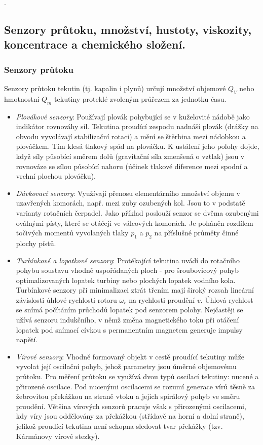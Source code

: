 \newpage . \newpage
\subsection{Senzory průtoku, množství, hustoty, viskozity, koncentrace a chemického složení.}
\subsubsection*{Senzory průtoku}
Senzory průtoku tekutin (tj. kapalin i plynů) určují množství objemové $ Q_V $ nebo hmotnostní $ Q_m $ tekutiny proteklé zvoleným průřezem za jednotku času.
\begin{itemize}
\item \textit{Plovákové senzory}: Používají plovák pohybující se v kuželovité nádobě jako indikátor rovnováhy sil. Tekutina proudící zespodu nadnáší plovák (drážky na obvodu vyvolávají stabilizační rotaci) a mění se štěrbina mezi nádobkou a plováčkem. Tím klesá tlakový spád na plováčku. K ustálení jeho polohy dojde, když síly působící směrem dolů (gravitační síla zmenšená o vztlak) jsou v rovnováze se sílou působící nahoru (účinek tlakové diference mezi spodní a vrchní plochou plováčku).
\item \textit{Dávkovací senzory}: Využívají přenosu elementárního množství objemu v uzavřených komorách, např. mezi zuby ozubených kol. Jsou to v podstatě varianty rotačních čerpadel. Jako příklad poslouží senzor se dvěma ozubenými oválnými písty, které se otáčejí ve válcových komorách. Je poháněn rozdílem točivých momentů vyvolaných tlaky $ p_1 $ a $ p_2 $ na příslušné průměty činné plochy pístů.
\item \textit{Turbínkové a lopatkové senzory}: Protékající tekutina uvádí do rotačního pohybu soustavu vhodně uspořádaných ploch - pro šroubovicový pohyb optimalizovaných lopatek turbiny nebo plochých lopatek vodního kola. Turbínkové senzory při minimalizaci ztrát třením mají široký rozsah lineární závislosti úhlové rychlosti rotoru $ \omega_r $ na rychlosti proudění $ v $. Úhlová rychlost se snímá počítáním průchodů lopatek pod senzorem polohy. Nejčastěji se užívá senzoru indukčního, v němž změna magnetického toku při otáčení lopatek pod snímací cívkou s permanentním magnetem generuje impulsy napětí.
\item \textit{Vírové senzory}: Vhodně formovaný objekt v cestě proudící tekutiny může vyvolat její oscilační pohyb, jehož parametry jsou úměrné objemovému průtoku. Pro měření průtoku se využívá dvou typů oscilací tekutiny: nucené a přirozené oscilace. Pod nucenými oscilacemi se rozumí generace vírů těsně za žebrovitou překážkou na straně vtoku a jejich spirálový pohyb ve směru proudění. Většina vírových senzorů pracuje však s přirozenými oscilacemi, kdy víry jsou oddělovány za překážkou (střídavě na horní a dolní straně), jelikož proudící tekutina není schopna sledovat tvar překážky (tzv. Kármánovy vírové stezky).

\end{itemize}
